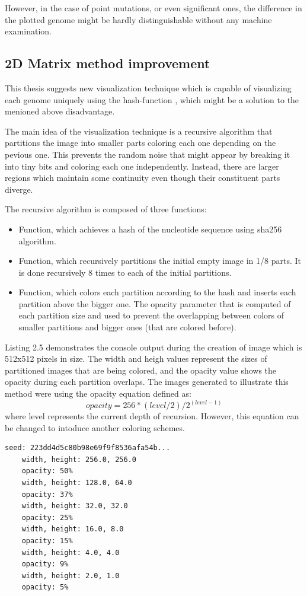 However, in the case of point mutations, or even significant ones, the difference in the plotted genome might be hardly distinguishable without any machine examination.

\subsection{2D Matrix method improvement}
This thesis suggests new visualization technique which is capable of visualizing each genome uniquely using the hash-function \cite{hash}, which might be a solution to the menioned above disadvantage.

The main idea of the visualization technique is a recursive algorithm that partitions the image into smaller parts coloring each one depending on the pevious one.
This prevents the random noise that might appear by breaking it into tiny bits and coloring each one independently. 
Instead, there are larger regions which maintain some continuity even though their constituent parts diverge.

The recursive algorithm is composed of three functions: 
\begin{itemize}
    \item Function, which achieves a hash of the nucleotide sequence using sha256 algorithm.
    \item Function, which recursively partitions the initial empty image in 1/8 parts.
    It is done recursively 8 times to each of the initial partitions. 
    \item Function, which colors each partition according to the hash and inserts each partition above the bigger one.
    The opacity parameter that is computed of each partition size and used to prevent the overlapping between colors of smaller partitions and bigger ones (that are colored before).
\end{itemize}

Listing 2.5 demonstrates the console output during the creation of image which is 512x512 pixels in size.
The width and heigh values represent the sizes of partitioned images that are being colored, and the opacity value shows the opacity during each partition overlaps.
The images generated to illustrate this method were using the opacity equation defined as:\\
\[opacity = 256 * (level / 2) / 2 ^ {(level - 1)}\]
where level represents the current depth of recursion.
However, this equation can be changed to intoduce another coloring schemes.

\begin{lstlisting}[caption=Console output prodused during the visualization using the improved 2D Matrix method.]
    seed: 223dd4d5c80b98e69f9f8536afa54b...
    width, height: 256.0, 256.0
    opacity: 50%
    width, height: 128.0, 64.0
    opacity: 37%
    width, height: 32.0, 32.0
    opacity: 25%
    width, height: 16.0, 8.0
    opacity: 15%
    width, height: 4.0, 4.0
    opacity: 9%
    width, height: 2.0, 1.0
    opacity: 5%
\end{lstlisting}

